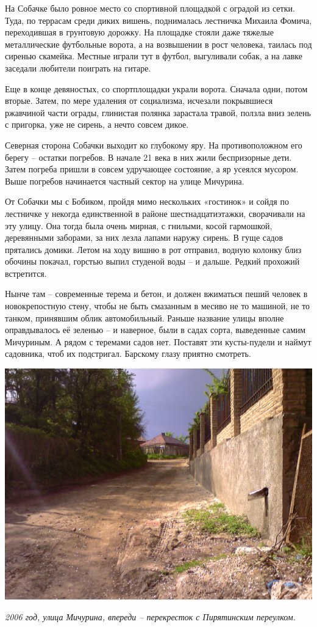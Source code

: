 На Собачке было ровное место со спортивной площадкой с оградой из сетки. Туда, по террасам среди диких вишень, поднималась лестничка Михаила Фомича, переходившая в грунтовую дорожку. На площадке стояли даже тяжелые металлические футбольные ворота, а на возвышении в рост человека, таилась под сиренью скамейка. Местные играли тут в футбол, выгуливали собак, а на лавке заседали любители поиграть на гитаре.

Еще в конце девяностых, со спортплощадки украли ворота. Сначала одни, потом вторые. Затем, по мере удаления от социализма, исчезали покрывшиеся ржавчиной части ограды, глинистая полянка зарастала травой, ползла вниз зелень с пригорка, уже не сирень, а нечто совсем дикое.

Северная сторона Собачки выходит ко глубокому яру. На противоположном его берегу – остатки погребов. В начале 21 века в них жили беспризорные дети. Затем погреба пришли в совсем удручающее состояние, а яр усеялся мусором. Выше погребов начинается частный сектор на улице Мичурина.

От Собачки мы с Бобиком, пройдя мимо нескольких «гостинок» и сойдя по лестничке у некогда единственной в районе шестнадцатиэтажки, сворачивали на эту улицу. Она тогда была очень мирная, с гнилыми, косой гармошкой, деревянными заборами, за них лезла лапами наружу сирень. В гуще садов прятались домики. Летом на ходу вишню в рот отправил, водную колонку близ обочины покачал, горстью выпил студеной воды – и дальше. Редкий прохожий встретится.

Нынче там – современные терема и бетон, и должен вжиматься пеший человек в новокрепостную стену, чтобы не быть смазанным в месиво не то машиной, не то танком, принявшим облик автомобильный. Раньше название улицы вполне оправдывалось её зеленью – и наверное, были в садах сорта, выведенные самим Мичуриным. А рядом с теремами садов нет. Поставят эти кусты-пудели и наймут садовника, чтоб их подстригал. Барскому глазу приятно смотреть.

\begin{center}
\includegraphics[width=\linewidth]{chast-colebanie-osnov/nachalo/lomakovskaya01.jpg}

\textit{2006 год, улица Мичурина, впереди – перекресток с Пирятинским переулком.} 
\end{center}


